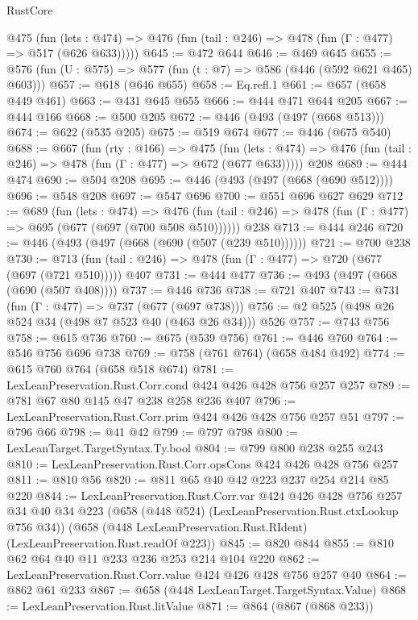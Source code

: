 \begin{lexlean}{RustCore}
\begin{coremodule}
    @475
      (fun (lets : @474) => @476 (fun (tail : @246) => @478 (fun (Γ : @477) => @517 (@626 @633)))))
@645 := @472 @644
@646 := @469 @645
@655 := @576 (fun (U : @575) => @577 (fun (t : @7) => @586 (@446 (@592 @621 @465) @603)))
@657 := @618 (@646 @655)
@658 := Eq.refl.{1}
@661 := @657 (@658 @449 @461)
@663 := @431 @645 @655
@666 := @444 @471 @644 @205
@667 := @444 @166
@668 := @500 @205
@672 := @446 (@493 (@497 (@668 @513)))
@674 := @622 (@535 @205)
@675 := @519 @674
@677 := @446 (@675 @540)
@688 := @667
    (fun (rty : @166) =>
    @475
      (fun (lets : @474) => @476 (fun (tail : @246) => @478 (fun (Γ : @477) => @672 (@677 @633)))))
    @208
@689 := @444 @474
@690 := @504 @208
@695 := @446 (@493 (@497 (@668 (@690 @512))))
@696 := @548 @208
@697 := @547 @696
@700 := @551 @696 @627 @629
@712 := @689
    (fun (lets : @474) =>
    @476 (fun (tail : @246) => @478 (fun (Γ : @477) => @695 (@677 (@697 (@700 @508 @510))))))
    @238
@713 := @444 @246
@720 := @446 (@493 (@497 (@668 (@690 (@507 (@239 @510))))))
@721 := @700 @238
@730 := @713 (fun (tail : @246) => @478 (fun (Γ : @477) => @720 (@677 (@697 (@721 @510))))) @407
@731 := @444 @477
@736 := @493 (@497 (@668 (@690 (@507 @408))))
@737 := @446 @736
@738 := @721 @407
@743 := @731 (fun (Γ : @477) => @737 (@677 (@697 @738)))
@756 := @2 @525 (@498 @26 @524 @34 (@498 @7 @523 @40 (@463 @26 @34))) @526
@757 := @743 @756
@758 := @615 @736
@760 := @675 (@539 @756)
@761 := @446 @760
@764 := @546 @756 @696 @738
@769 := @758 (@761 @764) (@658 @484 @492)
@774 := @615 @760 @764 (@658 @518 @674)
@781 := LexLeanPreservation.Rust.Corr.cond @424 @426 @428 @756 @257 @257
@789 := @781 @67 @80 @145 @47 @238 @258 @236 @407
@796 := LexLeanPreservation.Rust.Corr.prim @424 @426 @428 @756 @257 @51
@797 := @796 @66
@798 := @41 @42
@799 := @797 @798
@800 := LexLeanTarget.TargetSyntax.Ty.bool
@804 := @799 @800 @238 @255 @243
@810 := LexLeanPreservation.Rust.Corr.opsCons @424 @426 @428 @756 @257
@811 := @810 @56
@820 := @811 @65 @40 @42 @223 @237 @254 @214 @85 @220
@844 := LexLeanPreservation.Rust.Corr.var
    @424
    @426
    @428
    @756
    @257
    @34
    @40
    @34
    @223
    (@658 (@448 @524) (LexLeanPreservation.Rust.ctxLookup @756 @34))
    (@658 (@448 LexLeanPreservation.Rust.RIdent) (LexLeanPreservation.Rust.readOf @223))
@845 := @820 @844
@855 := @810 @62 @64 @40 @11 @233 @236 @253 @214 @104 @220
@862 := LexLeanPreservation.Rust.Corr.value @424 @426 @428 @756 @257 @40
@864 := @862 @61 @233
@867 := @658 (@448 LexLeanTarget.TargetSyntax.Value)
@868 := LexLeanPreservation.Rust.litValue
@871 := @864 (@867 (@868 @233))

\end{coremodule}
\end{lexlean}
